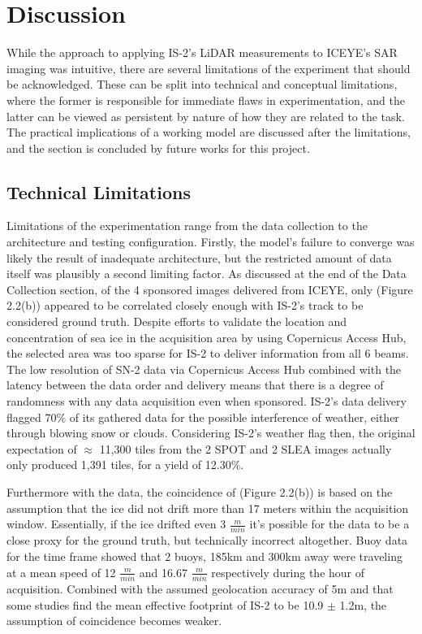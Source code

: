 \chapter{Discussion}
\label{sec:Discussion}
While the approach to applying IS-2's LiDAR measurements to ICEYE's SAR imaging was intuitive, there are several limitations of the experiment that should be acknowledged. These can be split into technical and conceptual limitations, where the former is responsible for immediate flaws in experimentation, and the latter can be viewed as persistent by nature of how they are related to the task. The practical implications of a working model are discussed after the limitations, and the section is concluded by future works for this project.

\section{Technical Limitations}
Limitations of the experimentation range from the data collection to the architecture and testing configuration. Firstly, the model's failure to converge was likely the result of inadequate architecture, but the restricted amount of data itself was plausibly a second limiting factor. As discussed at the end of the Data Collection section, of the 4 sponsored images delivered from ICEYE, only (Figure 2.2(b)) appeared to be correlated closely enough with IS-2's track to be considered ground truth. Despite efforts to validate the location and concentration of sea ice in the acquisition area by using Copernicus Access Hub, the selected area was too sparse for IS-2 to deliver information from all 6 beams. The low resolution of SN-2 data via Copernicus Access Hub combined with the latency between the data order and delivery means that there is a degree of randomness with any data acquisition even when sponsored. IS-2's data delivery flagged 70$\%$ of its gathered data for the possible interference of weather, either through blowing snow or clouds. Considering IS-2's weather flag then, the original expectation of $\approx$ 11,300 tiles from the 2 SPOT and 2 SLEA images actually only produced 1,391 tiles, for a yield of 12.30$\%$.

Furthermore with the data, the coincidence of (Figure 2.2(b)) is based on the assumption that the ice did not drift more than 17 meters within the acquisition window. Essentially, if the ice drifted even 3 $\frac{m}{min}$ it's possible for the data to be a close proxy for the ground truth, but technically incorrect altogether. Buoy data for the time frame showed that 2 buoys, 185km and 300km away were traveling at a mean speed of 12 $\frac{m}{min}$ and 16.67 $\frac{m}{min}$ respectively during the hour of acquisition. Combined with the assumed geolocation accuracy of 5m \cite{ICESat-2-Horizontal-Accuracy} and that some studies find the mean effective footprint of IS-2 to be 10.9 $\pm$ 1.2m\cite{icesatfootprintdiameter}, the assumption of coincidence becomes weaker.

